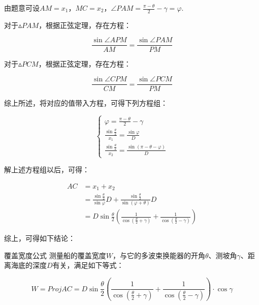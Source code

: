 由题意可设$AM=x_1$，$MC=x_2$，$\angle PAM = \frac{\pi - \theta}{2} - \gamma = \varphi $.

对于$\vartriangle PAM$，根据正弦定理，存在方程：

\begin{equation*}
    \frac{\sin\angle APM}{AM} = \frac{\sin\angle PAM}{PM}
\end{equation*}

对于$\vartriangle PCM$，根据正弦定理，存在方程：

\begin{equation*}
    \frac{\sin\angle CPM}{CM} = \frac{\sin\angle PCM}{PM}
\end{equation*}

综上所述，将对应的值带入方程，可得下列方程组：

\begin{equation}
    \begin{cases}
        \varphi = \frac{\pi - \theta}{2} - \gamma                 \\
        \frac{\sin \frac{\theta}{2}}{x_1} = \frac{\sin\varphi}{D} \\
        \frac{\sin \frac{\theta}{2}}{x_2} = \frac{\sin(\pi-\theta-\varphi)}{D}
    \end{cases}
\end{equation}

解上述方程组以后，可得：

\begin{equation}
    \begin{aligned}
        AC & = x_1 + x_2                                                                                                           \\
           & = \frac{\sin\frac{\theta}{2}}{\sin\varphi}D + \frac{\sin\frac{\theta}{2}}{\sin(\varphi + \theta)}D                    \\
           & = D\sin\frac{\theta}{2}\left(\frac{1}{\cos(\frac{\theta}{2}+\gamma)} + \frac{1}{\cos(\frac{\theta}{2}-\gamma)}\right)
    \end{aligned}
\end{equation}

综上，可得如下结论：

\begin{mcmTheorem}{覆盖宽度公式}
    测量船的覆盖宽度$W$，与它的多波束换能器的开角$\theta$、测坡角$\gamma$、距离海底的深度$D$有关，满足如下等式：

    \begin{equation}
        W =
        Proj AC =
        D\sin\frac{\theta}{2}\left(\frac{1}{\cos(\frac{\theta}{2}+\gamma)} + \frac{1}{\cos(\frac{\theta}{2}-\gamma)}\right) \cdot \cos \gamma
    \end{equation}
\end{mcmTheorem}

